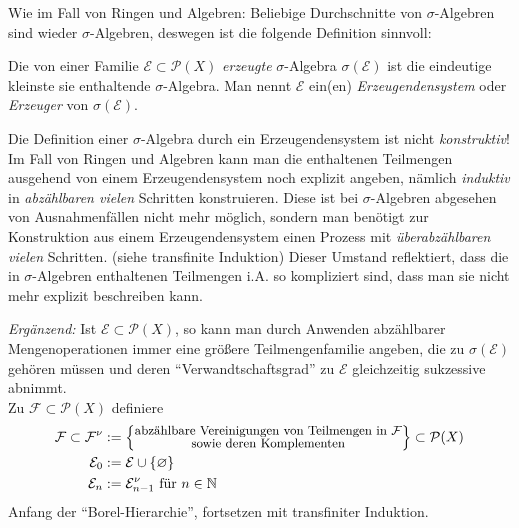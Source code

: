 Wie im Fall von Ringen und Algebren: Beliebige Durchschnitte von $\sigma$-Algebren sind wieder $\sigma$-Algebren, deswegen ist die folgende Definition sinnvoll:

\begin{definition}
\begin{mdframed}
Die von einer Familie $\mathcal{E}\subset \mathcal{P}(X)$ \emph{erzeugte} $\sigma$-Algebra $\sigma(\mathcal{E})$  ist die eindeutige kleinste sie enthaltende $\sigma$-Algebra. Man nennt $\mathcal{E}$ ein(en) \emph{Erzeugendensystem} oder \emph{Erzeuger} von $\sigma(\mathcal{E})$.
\end{mdframed}
\end{definition}
Die Definition einer $\sigma$-Algebra durch ein Erzeugendensystem ist nicht \emph{konstruktiv}! Im Fall von Ringen und Algebren kann man die enthaltenen Teilmengen ausgehend von einem Erzeugendensystem noch explizit angeben, nämlich \emph{induktiv} in \emph{abzählbaren vielen} Schritten konstruieren. Diese ist bei $\sigma$-Algebren abgesehen von Ausnahmenfällen nicht mehr möglich, sondern man benötigt zur Konstruktion aus einem Erzeugendensystem einen Prozess mit \emph{überabzählbaren vielen} Schritten. (siehe transfinite Induktion) Dieser Umstand reflektiert, dass die in $\sigma$-Algebren enthaltenen Teilmengen i.A. so kompliziert sind, dass man sie nicht mehr explizit beschreiben kann. \newline \newline
\begin{small}
\textit{Ergänzend:} Ist $\mathcal{E}\subset\mathcal{P}(X)$, so kann man durch Anwenden abzählbarer Mengenoperationen immer eine größere Teilmengenfamilie angeben, die zu $\sigma(\mathcal{E})$ gehören müssen und deren ``Verwandtschaftsgrad'' zu $\mathcal{E}$ gleichzeitig sukzessive abnimmt.\\
Zu $\mathcal{F} \subset \mathcal{P}(X)$ definiere 
\begin{equation*}
\begin{split}
\mathcal{F} \subset \mathcal{F}^\nu & := \left\{
\substack{\text{\small abzählbare Vereinigungen von Teilmengen in $\mathcal{F}$}  \\ \text{\small sowie deren Komplementen}}
\right\} \subset \mathcal{P}(X) 	\\
\mathcal{E}_0 & := \mathcal{E} \cup \{\varnothing\} \\
\mathcal{E}_n & := \mathcal{E}^\nu_{n-1}	\text{ für } n\in \mathbb{N}
\end{split}
\end{equation*}
Anfang der ``Borel-Hierarchie'', fortsetzen mit transfiniter Induktion.
\end{small} 

